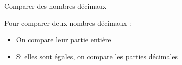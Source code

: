 \prop
{Comparer des nombres décimaux}
{Pour comparer deux nombres décimaux :
\begin{itemize}
    \item On compare leur partie entière
    \item Si elles sont égales, on compare les parties décimales
\end{itemize}
}


